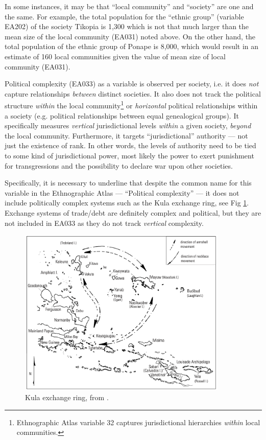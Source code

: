 \documentclass[a4paper,10pt]{article} %
\begin{document}
In some instances, it may be that ``local community'' and ``society'' are one and the same. For example, the total population for the ``ethnic group'' (variable EA202) of the society Tikopia is 1,300 which is not that much larger than the mean size of the local community (EA031) noted above. On the other hand, the total population of the ethnic group of Ponape is 8,000, which would result in an estimate of 160 local communities given the value of mean size of local community (EA031).
  
Political complexity (EA033) as a variable is observed per society, i.e. it does \emph{not} capture relationships \emph{between} distinct societies. It also does not track the political structure \emph{within} the local community\footnote{Ethnographic Atlas variable 32 captures jurisdictional hierarchies \emph{within} local communities.} or \emph{horizontal} political relationships within a society (e.g. political relationships between equal genealogical groups). It specifically measures \emph{vertical} jurisdictional levels \emph{within} a given society, \emph{beyond} the local community. Furthermore, it targets ``jurisdictional'' authority --- not just the existence of rank. In other words, the levels of authority need to be tied to some kind of jurisdictional power, most likely the power to exert punishment for transgressions and the possibility to declare war upon other societies. 

Specifically, it is necessary to underline that despite the common name for this variable in the Ethnographic Atlas --- ``Political complexity'' --- it does not include politically complex systems such as the Kula exchange ring\citet{damon2002kula}, see Fig \ref{kula_ring}. Exchange systems of trade/debt are definitely complex and political, but they are not included in EA033 as they do not track \emph{vertical} complexity.

\begin{figure}[ht]
\centering
\includegraphics[width=10cm]{latex/kula_ring_damon.png}
\caption{Kula exchange ring, from \citet{damon2002kula}.}
\label{kula_ring}
\end{figure}
\end{document}
